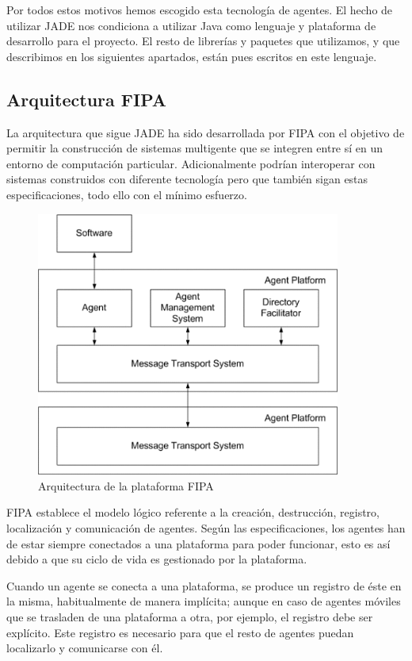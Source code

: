 Por todos estos motivos hemos escogido esta tecnología de agentes. El hecho de
utilizar JADE nos condiciona a utilizar Java como lenguaje y plataforma de
desarrollo para el proyecto. El resto de librerías y paquetes que utilizamos, y
que describimos en los siguientes apartados, están pues escritos en este
lenguaje.

\subsection{Arquitectura FIPA}

La arquitectura que sigue JADE ha sido desarrollada por FIPA con el objetivo de
permitir la construcción de sistemas multigente que se integren entre sí en un
entorno de computación particular. Adicionalmente podrían interoperar con
sistemas construidos con diferente tecnología pero que también sigan estas
especificaciones, todo ello con el mínimo esfuerzo.

\begin{figure}[H]
 \centering
 \includegraphics[width=100mm]{figuras/cap4/fipa.png}
 \caption{Arquitectura de la plataforma FIPA}
\end{figure}

FIPA establece el modelo lógico referente a la creación, destrucción, registro,
localización y comunicación de agentes. Según las especificaciones, los agentes
han de estar siempre conectados a una plataforma para poder funcionar, esto es
así debido a que su ciclo de vida es gestionado por la plataforma.

Cuando un agente se conecta a una plataforma, se produce un registro de éste
en la misma, habitualmente de manera implícita; aunque en caso de agentes
móviles que se trasladen de una plataforma a otra, por ejemplo, el registro debe
ser explícito. Este registro es necesario para que el resto de agentes puedan
localizarlo y comunicarse con él.

